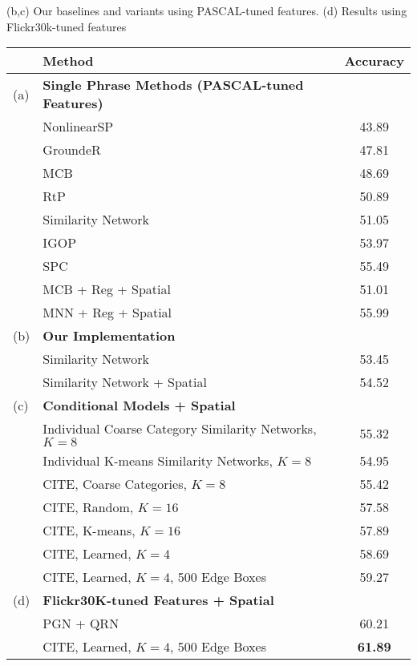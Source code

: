 \documentclass[runningheads]{llncs}
\makeatletter
\DeclareRobustCommand\onedot{\futurelet\@let@token\@onedot}
\def\@onedot{\ifx\@let@token.\else.\null\fi\xspace}
\def\etal{\emph{et al}\onedot}
\makeatother
\begin{document}
\begin{table}[t]
{(b,c) Our baselines and variants using PASCAL-tuned features. (d) Results using Flickr30k-tuned features}
\label{tab:flickr_overall}
    \begin{tabular}{|ll|c|}
      \hline
      & Method & Accuracy\\
      \hline
      \hline
      (a) & {\bf Single Phrase Methods (PASCAL-tuned Features)\footnotemark} & \\
      & NonlinearSP~\cite{wang2016CVPR} &  43.89 \\
      & GroundeR~\cite{rohrbach2015} &  47.81 \\
      & MCB~\cite{fukui16emnlp} &  48.69 \\
      & RtP~\cite{flickrentitiesijcv} &  50.89 \\
      & Similarity Network%
      ~\cite{wangTwoBranch2017} 
      &  51.05 \\
      & IGOP~\cite{yehNIPS2017} & 53.97\\
      & SPC~\cite{plummerPLCLC2017} & 55.49\\
      & MCB + Reg + Spatial~\cite{ChenICMR2017} & 51.01\\
      & MNN + Reg + Spatial~\cite{ChenICMR2017} & 55.99\\
      \hline
      (b) & {\bf Our Implementation} &\\
      & Similarity Network & 53.45 \\
      & Similarity Network + Spatial & 54.52 \\
      \hline
      (c) & {\bf Conditional Models + Spatial} &\\
      & Individual Coarse Category Similarity Networks, $K=8$ & 55.32\\
      & Individual K-means Similarity Networks, $K=8$ & 54.95\\
      & CITE, Coarse Categories, $K=8$ & 55.42\\
      & CITE, Random, $K=16$ & 57.58\\
      & CITE, K-means, $K=16$ & 57.89\\
      & CITE, Learned, $K=4$ & 58.69\\
      & CITE, Learned, $K=4$, 500 Edge Boxes & 59.27\\
      \hline
      (d) & {\bf Flickr30K-tuned Features + Spatial} &\\
      & PGN + QRN~\cite{ChenICCV2017} & 60.21\\
      & CITE, Learned, $K=4$, 500 Edge Boxes & {\bf 61.89}\\
      \hline
    \end{tabular}
\end{table}
\end{document}
